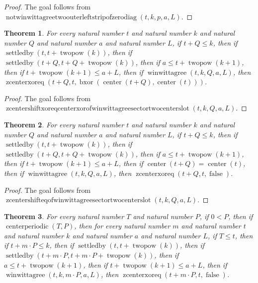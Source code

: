 \documentclass[11pt]{article}
\newtheorem{theorem}{Theorem}[section]
\theoremstyle{definition}
\begin{document}
\begin{proof}
The goal follows from \(\operatorname{notwinwittagreetwoouterleftstripofzerodiag}(t, k, p, a, L)\).
\end{proof}
\begin{theorem}
\label{ll:paper:zcenter-shift-xor-eq-center-xor-of-winwittagree-sector-two-center-slot}
For every natural number \(t\) and natural number \(k\) and natural number \(Q\) and natural number \(a\) and natural number \(L\), if \(t + Q \le k\), then if \(\operatorname{settledby}(t, t + \operatorname{twopow}(k))\), then if \(\operatorname{settledby}(t + Q, t + Q + \operatorname{twopow}(k))\), then if \(a \le t + \operatorname{twopow}(k + 1)\), then if \(t + \operatorname{twopow}(k + 1) \le a + L\), then if \(\operatorname{winwittagree}(t, k, Q, a, L)\), then \(\operatorname{zcenterxoreq}(t + Q, t, \operatorname{bxor}(\operatorname{center}(t + Q), \operatorname{center}(t)))\).
\end{theorem}
\begin{proof}
The goal follows from \(\operatorname{zcentershiftxoreqcenterxorofwinwittagreesectortwocenterslot}(t, k, Q, a, L)\).
\end{proof}
\begin{theorem}
\label{ll:paper:zcenter-shift-eq-of-winwittagree-sector-two-center-slot}
For every natural number \(t\) and natural number \(k\) and natural number \(Q\) and natural number \(a\) and natural number \(L\), if \(t + Q \le k\), then if \(\operatorname{settledby}(t, t + \operatorname{twopow}(k))\), then if \(\operatorname{settledby}(t + Q, t + Q + \operatorname{twopow}(k))\), then if \(a \le t + \operatorname{twopow}(k + 1)\), then if \(t + \operatorname{twopow}(k + 1) \le a + L\), then if \(\operatorname{center}(t + Q) = \operatorname{center}(t)\), then if \(\operatorname{winwittagree}(t, k, Q, a, L)\), then \(\operatorname{zcenterxoreq}(t + Q, t, \operatorname{false})\).
\end{theorem}
\begin{proof}
The goal follows from \(\operatorname{zcentershifteqofwinwittagreesectortwocenterslot}(t, k, Q, a, L)\).
\end{proof}
\begin{theorem}
\label{ll:paper:periodic-zcenter-shift-eq-of-winwittagree-sector-two-center-slot}
For every natural number \(T\) and natural number \(P\), if \(0 < P\), then if \(\operatorname{centerperiodic}(T, P)\), then for every natural number \(m\) and natural number \(t\) and natural number \(k\) and natural number \(a\) and natural number \(L\), if \(T \le t\), then if \(t + m \cdot P \le k\), then if \(\operatorname{settledby}(t, t + \operatorname{twopow}(k))\), then if \(\operatorname{settledby}(t + m \cdot P, t + m \cdot P + \operatorname{twopow}(k))\), then if \(a \le t + \operatorname{twopow}(k + 1)\), then if \(t + \operatorname{twopow}(k + 1) \le a + L\), then if \(\operatorname{winwittagree}(t, k, m \cdot P, a, L)\), then \(\operatorname{zcenterxoreq}(t + m \cdot P, t, \operatorname{false})\).
\end{theorem}
\end{document}
